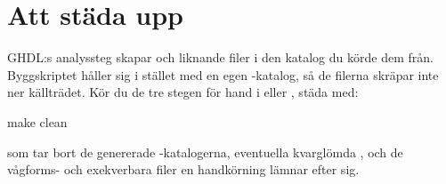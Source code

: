 \section{Att städa upp}
\label{app:sim:clean}

GHDL:s analyssteg skapar  och liknande filer i den katalog du körde dem från.
Byggskriptet håller sig i stället med en egen -katalog, så de filerna skräpar inte ner
källträdet. Kör du de tre stegen för hand i  eller , städa med:

\begin{shell}
make clean
\end{shell}

som tar bort de genererade -katalogerna, eventuella kvarglömda , och
de vågforms- och exekverbara filer en handkörning lämnar efter sig.

